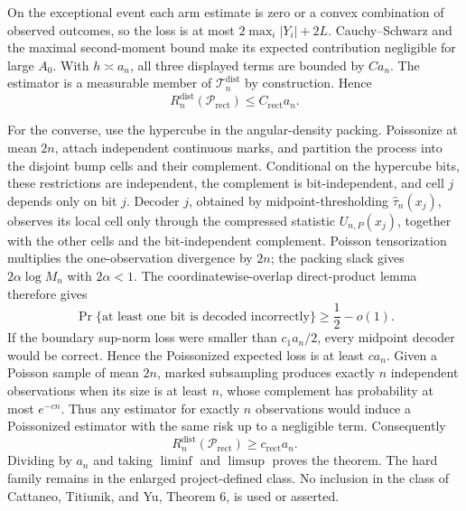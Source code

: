 On the exceptional event each arm estimate is zero or a convex combination of observed outcomes, so the loss is at most \(2\max_i|Y_i|+2L\).  Cauchy--Schwarz and the maximal second-moment bound make its expected contribution negligible for large \(A_0\).  With \(h\asymp a_n\), all three displayed terms are bounded by \(Ca_n\).  The estimator is a measurable member of \(\mathcal T_n^{\mathrm{dist}}\) by construction.  Hence
\[
 R_n^{\mathrm{dist}}(\mathcal P_{\mathrm{rect}})\leq C_{\mathrm{rect}}a_n.
\]

For the converse, use the hypercube in the angular-density packing.  Poissonize at mean \(2n\), attach independent continuous marks, and partition the process into the disjoint bump cells and their complement.  Conditional on the hypercube bits, these restrictions are independent, the complement is bit-independent, and cell \(j\) depends only on bit \(j\).  Decoder \(j\), obtained by midpoint-thresholding \(\widehat\tau_n(x_j)\), observes its local cell only through the compressed statistic \(U_{n,P}(x_j)\), together with the other cells and the bit-independent complement.  Poisson tensorization multiplies the one-observation divergence by \(2n\); the packing slack gives \(2\alpha\log M_n\) with \(2\alpha<1\).  The coordinatewise-overlap direct-product lemma therefore gives
\[
 \Pr\{\text{at least one bit is decoded incorrectly}\}\geq\frac12-o(1).
\]
If the boundary sup-norm loss were smaller than \(c_1a_n/2\), every midpoint decoder would be correct.  Hence the Poissonized expected loss is at least \(ca_n\).  Given a Poisson sample of mean \(2n\), marked subsampling produces exactly \(n\) independent observations when its size is at least \(n\), whose complement has probability at most \(e^{-cn}\).  Thus any estimator for exactly \(n\) observations would induce a Poissonized estimator with the same risk up to a negligible term.  Consequently
\[
 R_n^{\mathrm{dist}}(\mathcal P_{\mathrm{rect}})\geq c_{\mathrm{rect}}a_n.
\]
Dividing by \(a_n\) and taking \(\liminf\) and \(\limsup\) proves the theorem.  The hard family remains in the enlarged project-defined class.  No inclusion in the class of Cattaneo, Titiunik, and Yu, Theorem 6, is used or asserted.